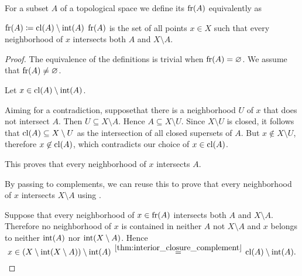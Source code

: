 \begin{definition}\label{def:topological_boundary}
  For a subset \( A \) of a topological space we define its  \( \operatorname{fr}(A) \) equivalently as
  \begin{thmenum}
     \( \operatorname{fr}(A) \coloneqq \operatorname{cl}(A) \setminus \operatorname{int}(A) \)
     \( \operatorname{fr}(A) \) is the set of all points \( x \in X \) such that every neighborhood of \( x \) intersects both \( A \) and \( X \setminus A \).
  \end{thmenum}
\end{definition}
\begin{proof}
  The equivalence of the definitions is trivial when \( \operatorname{fr}(A) = \varnothing \). We assume that \( \operatorname{fr}(A) \neq \varnothing \).

   Let \( x \in \operatorname{cl}(A) \setminus \operatorname{int}(A) \).

  Aiming for a contradiction, suppose\DNE that there is a neighborhood \( U \) of \( x \) that does not intersect \( A \). Then \( U \subseteq X \setminus A \). Hence \( A \subseteq X \setminus U \). Since \( X \setminus U \) is closed, it follows that \( \operatorname{cl}(A) \subseteq X \setminus U \) as the intersection of all closed supersets of \( A \). But \( x \not\in X \setminus U \), therefore \( x \not\in \operatorname{cl}(A) \), which contradicts our choice of \( x \in \operatorname{cl}(A) \).

  This proves that every neighborhood of \( x \) intersects \( A \).

  By passing to complements, we can reuse this to prove that every neighborhood of \( x \) intersects \( X \setminus A \) using .

   Suppose that every neighborhood of \( x \in \operatorname{fr}(A) \) intersects both \( A \) and \( X \setminus A \). Therefore no neighborhood of \( x \) is contained in neither \( A \) not \( X \setminus A \) and \( x \) belongs to neither \( \operatorname{int}(A) \) nor \( \operatorname{int}(X \setminus A) \). Hence
  \begin{equation*}
    x \in (X \setminus \inter(X \setminus A)) \setminus \inter(A) \reloset {\ref{thm:interior_closure_complement}} = \cl(A) \setminus \inter(A).
  \end{equation*}
\end{proof}


